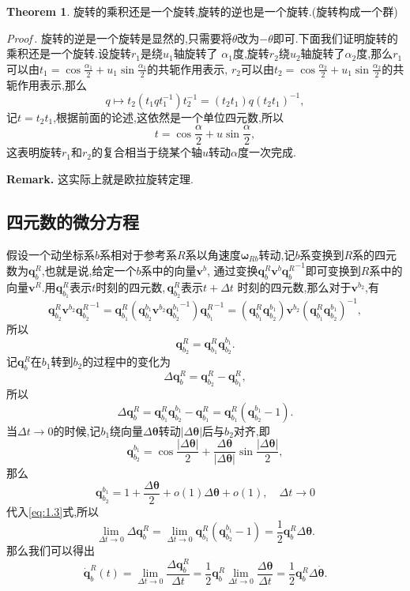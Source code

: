 \documentclass[10pt,a4paper]{ctexbook}
\theoremstyle{definition}
\newtheorem{theorem}{Theorem}[section]
\newenvironment{remark}{\par\noindent\textbf{Remark.}\;\kaishu}{\par}
\renewcommand{\proofname}{Proof}
\renewenvironment{proof}[1][]{\par\noindent\textit{\proofname\,#1.}\;\fangsong}{\hfill$\boxed{}$\par}
\begin{document}
\begin{theorem}
    旋转的乘积还是一个旋转,旋转的逆也是一个旋转.(旋转构成一个群)
\end{theorem}
\begin{proof}
    旋转的逆是一个旋转是显然的,只需要将$\theta$改为$-\theta$即可.下面我们证明旋转的乘积还是一个旋转.设旋转$r_1$是绕$u_1$轴旋转了%
    $\alpha_1$度,旋转$r_2$绕$u_2$轴旋转了$\alpha_2$度,那么$r_1$可以由$t_1=\cos\frac{\alpha_1}{2}+u_1\sin\frac{\alpha_1}{2}$的共轭作用表示,%
    $r_2$可以由$t_2=\cos\frac{\alpha_2}{2}+u_1\sin\frac{\alpha_2}{2}$的共轭作用表示,那么
    \[
        q\mapsto t_2(t_1qt_1^{-1})t_2^{-1}=(t_2t_1)q(t_2t_1)^{-1},
    \]
    记$t=t_2t_1$,根据前面的论述,这依然是一个单位四元数,所以
    \[
        t=\cos\frac{\alpha}{2}+u\sin\frac{\alpha}{2},
    \]
    这表明旋转$r_1$和$r_2$的复合相当于绕某个轴$u$转动$\alpha$度一次完成.
\end{proof}
\begin{remark}
    这实际上就是欧拉旋转定理.
\end{remark}

\subsection{四元数的微分方程}
假设一个动坐标系$b$系相对于参考系$R$系以角速度$\bm{\omega}_{Rb}$转动,记$b$系变换到$R$系的四元数为$\bm{q}_b^R$,也就是说,给定一个$b$系中的向量$\bm{v}^b$,%
通过变换$\bm{q}_b^R \bm{v}^b {\bm{q}_b^{R}}^{-1}$即可变换到$R$系中的向量$\bm{v}^R$.用$\bm{q}_{b_1}^R$表示$t$时刻的四元数,\,$\bm{q}_{b_2}^R$表示$t+\Delta t$%
时刻的四元数,那么对于$\bm{v}^{b_2}$,有
\[
    \bm{q}_{b_2}^R\bm{v}^{b_2}{\bm{q}_{b_2}^R}^{-1}=\bm{q}_{b_1}^R(\bm{q}_{b_2}^{b_1}\bm{v}^{b_2}{\bm{q}_{b_2}^{b_1}}^{-1}){\bm{q}_{b_1}^R}^{-1}
    =(\bm{q}_{b_1}^{R}\bm{q}_{b_2}^{b_1})\bm{v}^{b_2}(\bm{q}_{b_1}^{R}\bm{q}_{b_2}^{b_1})^{-1},
\]
所以
\[
    \bm{q}_{b_2}^R=\bm{q}_{b_1}^R\bm{q}_{b_2}^{b_1}.
\]
记$\bm{q}_b^R$在$b_1$转到$b_2$的过程中的变化为
\[
    \Delta \bm{q}_b^R=\bm{q}_{b_2}^R-\bm{q}_{b_1}^R,
\]
所以
\begin{equation}\label{eq:1.3}
    \Delta\boldsymbol{q}_b^R =\boldsymbol{q}_{b_1}^R\boldsymbol{q}_{b_2}^{b_1} - \boldsymbol{q}_{b_1}^R =\boldsymbol{q}_{b_1}^R(\boldsymbol{q}_{b_2}^{b_1} -1).
\end{equation}
当$\Delta t\to 0$的时候,记$b_1$绕向量$\Delta\boldsymbol{\theta}$转动$|\Delta\boldsymbol{\theta}|$后与$b_2$对齐,即
\[
    \boldsymbol{q}_{b_2}^{b_1} = \cos \frac{|\Delta\boldsymbol{\theta}|}{2} + \frac{\Delta\boldsymbol{\theta}}{|\Delta\boldsymbol{\theta}|}\sin \frac{ |\Delta \boldsymbol{\theta}|}{2}, 
\]
那么
\[
    \boldsymbol{q}_{b_2}^{b_1} = 1 + \frac{ \Delta \boldsymbol{\theta}}{2} + o(1) \Delta \boldsymbol{\theta} + o(1),\quad \Delta t\to 0 
\]
代入\eqref{eq:1.3}式,所以
\[
    \lim_{\Delta t\to 0}\Delta\boldsymbol{q}_b^R =\lim_{\Delta t\to 0}\boldsymbol{q}_{b_1}^R(\boldsymbol{q}_{b_2}^{b_1} -1) = \frac{1}{2} \boldsymbol{q}_b^R \Delta \boldsymbol{ \theta }.
\]
那么我们可以得出
\[
    \dot{\boldsymbol{q}}_b^R(t) =\lim_{\Delta t\to 0} \frac{ \Delta \boldsymbol{q}_b^R}{ \Delta t}
    = \frac{1}{2} \boldsymbol{q}_b^R \lim_{ \Delta t\to 0} \frac{ \Delta \boldsymbol{ \theta }}{ \Delta t}
    =\frac{1}{2} \boldsymbol{q}_b^R \Delta \dot{ \boldsymbol{ \theta }}.
\]
\end{document}
